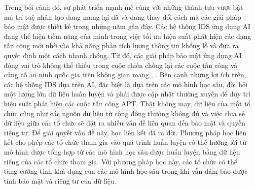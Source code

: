 \bigbreak\noindent
Trong bối cảnh đó, sự phát triển mạnh mẽ cùng với những thành tựu vượt bật mà trí tuệ nhân tạo đang mang lại đã và đang thay đổi cách mà các giải pháp bảo mật được thiết kế trong những năm gần đây. Các hệ thống IDS ứng dụng AI đang thể hiện tiềm năng của mình trong việc tối ưu hiệu suất phát hiện các dạng tấn công mới nhờ vào khả năng phân tích lượng thông tin khổng lồ và đưa ra quyết định một cách nhanh chóng. Từ đó, các giải pháp bảo mật ứng dụng AI đóng vai trò không thể thiếu trong cuộc chiến chống lại các cuộc tấn công và củng cố an ninh quốc gia trên không gian mạng \cite{radulov2019artificial}, \cite{schmidt2021national}. Bên cạnh những lợi ích trên, các hệ thống IDS dựa trên AI, đặc biệt là dựa trên các mô hình học sâu, đòi hỏi một lượng lớn dữ liệu huấn luyện và phải được cập nhật thường xuyên để duy trì hiệu suất phát hiện các cuộc tấn công APT. Thật không may, dữ liệu của một tổ chức cũng như các nguồn dữ liệu từ cộng đồng thường không đủ và việc chia sẻ dữ liệu giữa các tổ chức sẽ đặt ra nhiều vấn đề liên quan đến bảo mật và quyền riêng tư. Để giải quyết vấn đề này, học liên kết đã ra đời. Phương pháp học liên kết cho phép các tổ chức tham gia vào quá trình huấn luyện có thể hưởng lời từ mô hình được tổng hợp từ các mô hình học sâu được huấn luyện bằng dữ liệu riêng của các tổ chức tham gia. Với phương pháp học này, các tổ chức có thể tăng cường tính khả dụng của các mô hình học sâu trong khi vẫn đảm bảo được tính bảo mật và riêng tư của dữ liệu.
\bigbreak\noindent
